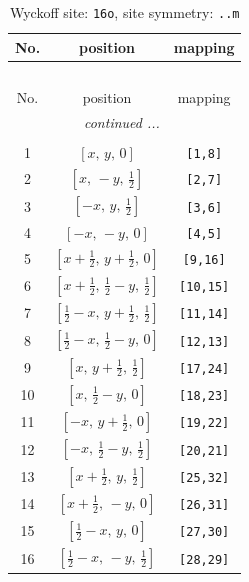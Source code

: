 \documentclass[fleqn,8pt]{jsarticle}
\begin{document}
\renewcommand{\arraystretch}{1.2}
\begin{longtable}{ccc}
\caption{Wyckoff site: {\tt 16o}, site symmetry: {\tt ..m}}
 \\
 \hline \hline
No. & position & mapping \\ \hline \endfirsthead

\multicolumn{2}{l}{\tablename\ \thetable{}} \\
 \hline \hline
No. & position & mapping \\ \hline \endhead

 \hline \hline
\multicolumn{2}{r}{\footnotesize\it continued ...} \\ \endfoot

 \hline \hline
\multicolumn{2}{r}{} \\ \endlastfoot

1 & $\left[ x,\, y,\, 0 \right]$ & {\tt [1,8]} \\ \hline
2 & $\left[ x,\, - y,\, \frac{1}{2} \right]$ & {\tt [2,7]} \\ \hline
3 & $\left[ - x,\, y,\, \frac{1}{2} \right]$ & {\tt [3,6]} \\ \hline
4 & $\left[ - x,\, - y,\, 0 \right]$ & {\tt [4,5]} \\ \hline
5 & $\left[ x + \frac{1}{2},\, y + \frac{1}{2},\, 0 \right]$ & {\tt [9,16]} \\ \hline
6 & $\left[ x + \frac{1}{2},\, \frac{1}{2} - y,\, \frac{1}{2} \right]$ & {\tt [10,15]} \\ \hline
7 & $\left[ \frac{1}{2} - x,\, y + \frac{1}{2},\, \frac{1}{2} \right]$ & {\tt [11,14]} \\ \hline
8 & $\left[ \frac{1}{2} - x,\, \frac{1}{2} - y,\, 0 \right]$ & {\tt [12,13]} \\ \hline
9 & $\left[ x,\, y + \frac{1}{2},\, \frac{1}{2} \right]$ & {\tt [17,24]} \\ \hline
10 & $\left[ x,\, \frac{1}{2} - y,\, 0 \right]$ & {\tt [18,23]} \\ \hline
11 & $\left[ - x,\, y + \frac{1}{2},\, 0 \right]$ & {\tt [19,22]} \\ \hline
12 & $\left[ - x,\, \frac{1}{2} - y,\, \frac{1}{2} \right]$ & {\tt [20,21]} \\ \hline
13 & $\left[ x + \frac{1}{2},\, y,\, \frac{1}{2} \right]$ & {\tt [25,32]} \\ \hline
14 & $\left[ x + \frac{1}{2},\, - y,\, 0 \right]$ & {\tt [26,31]} \\ \hline
15 & $\left[ \frac{1}{2} - x,\, y,\, 0 \right]$ & {\tt [27,30]} \\ \hline
16 & $\left[ \frac{1}{2} - x,\, - y,\, \frac{1}{2} \right]$ & {\tt [28,29]} \\
\end{longtable}
\end{document}
